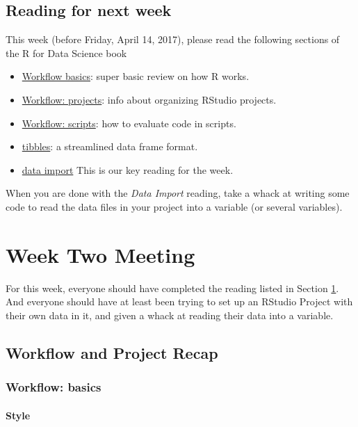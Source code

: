 \documentclass[]{book}
\providecommand{\tightlist}{%
  \setlength{\itemsep}{0pt}\setlength{\parskip}{0pt}}
\theoremstyle{definition}
\theoremstyle{definition}
\theoremstyle{remark}
\begin{document}
\section{Reading for next week}\label{week2reading}

This week (before Friday, April 14, 2017), please read the following
sections of the R for Data Science book

\begin{itemize}
\tightlist
\item
  \href{http://r4ds.had.co.nz/workflow-basics.html}{Workflow basics}:
  super basic review on how R works.
\item
  \href{http://r4ds.had.co.nz/workflow-projects.html}{Workflow:
  projects}: info about organizing RStudio projects.
\item
  \href{http://r4ds.had.co.nz/workflow-scripts.html}{Workflow: scripts}:
  how to evaluate code in scripts.
\item
  \href{http://r4ds.had.co.nz/tibbles.html}{tibbles}: a streamlined data
  frame format.
\item
  \href{http://r4ds.had.co.nz/data-import.html}{data import} This is our
  key reading for the week.
\end{itemize}

When you are done with the \emph{Data Import} reading, take a whack at
writing some code to read the data files in your project into a variable
(or several variables).

\chapter{Week Two Meeting}\label{week2}

For this week, everyone should have completed the reading listed in
Section \ref{week2reading}. And everyone should have at least been
trying to set up an RStudio Project with their own data in it, and given
a whack at reading their data into a variable.

\section{Workflow and Project Recap}\label{workflow-and-project-recap}

\subsection{Workflow: basics}\label{workflow-basics}

\subsubsection{Style}\label{style}
\end{document}
